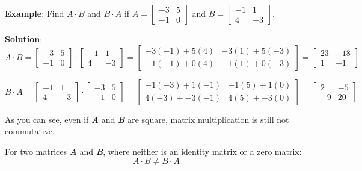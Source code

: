 \textbf{Example}: Find $\mathbf{\mathit{A}} \cdot \mathbf{\mathit{B}}$ and 
$\mathbf{\mathit{B}} \cdot \mathbf{\mathit{A}}$ if $\mathbf{\mathit{A}} = 
\begin{bmatrix}
-3 & 5\\
-1 & 0
\end{bmatrix}$ and $\mathbf{\mathit{B}} = \begin{bmatrix}
-1 & 1\\
4 & -3
\end{bmatrix}$.

\textbf{Solution}: $$\mathbf{\mathit{A}} \cdot \mathbf{\mathit{B}} = 
\begin{bmatrix}
-3 & 5\\
-1 & 0
\end{bmatrix} \cdot \begin{bmatrix}
-1 & 1\\
4 & -3
\end{bmatrix} = \begin{bmatrix}
-3(-1) + 5(4) & -3(1) + 5(-3)\\
-1(-1) + 0(4) & -1(1) + 0(-3)
\end{bmatrix} = \begin{bmatrix}
23 & -18\\
1 & -1
\end{bmatrix}$$

$$\mathbf{\mathit{B}} \cdot \mathbf{\mathit{A}} = \begin{bmatrix}
-1 & 1\\
4 & -3
\end{bmatrix} \cdot \begin{bmatrix}
-3 & 5\\
-1 & 0
\end{bmatrix} = \begin{bmatrix}
-1(-3) + 1(-1) & -1(5) + 1(0)\\
4(-3) + -3(-1) & 4(5) + -3(0)
\end{bmatrix} = \begin{bmatrix}
2 & -5\\
-9 & 20
\end{bmatrix}$$

As you can see, even if \textbf{\textit{A}} and \textbf{\textit{B}} are square, 
matrix multiplication is still not commutative. 

\begin{mdframed}[style = important, frametitle = {Non-Commutation of Matrix Multiplication}]
For two matrices \textbf{\textit{A}} and \textbf{\textit{B}}, where neither is 
an identity matrix or a zero matrix:
$$\mathbf{\mathit{A}} \cdot \mathbf{\mathit{B}} \neq \mathbf{\mathit{B}} 
\cdot \mathbf{\mathit{A}}$$
\end{mdframed}
	
